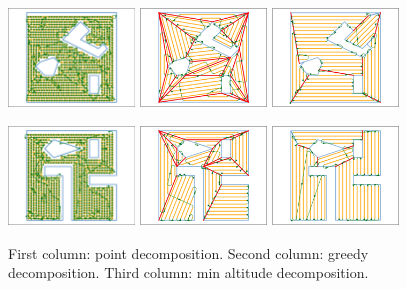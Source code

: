 \documentclass[../main.tex]{subfiles}
\begin{document}
\begin{figure}
		\includegraphics[width=0.3\textwidth]{img/chapter_4/point_12_coverage.png}%
		\includegraphics[width=0.3\textwidth]{img/chapter_4/greedy_12_coverage.pdf}%
		\includegraphics[width=0.3\textwidth]{img/chapter_4/min_12_coverage.pdf}

		\includegraphics[width=0.3\textwidth]{img/chapter_4/point_13_coverage.png}%
		\includegraphics[width=0.3\textwidth]{img/chapter_4/greedy_13_coverage.pdf}%
		\includegraphics[width=0.3\textwidth]{img/chapter_4/min_13_coverage.pdf}
	\caption{First column: point decomposition. Second column: greedy decomposition. Third column: min altitude decomposition.}
	\label{fig:coverage_results}
\end{figure}
\end{document}

